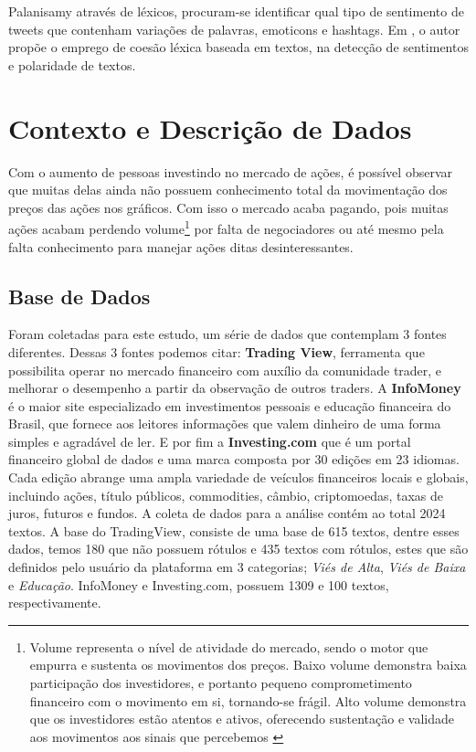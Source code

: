 \documentclass[conference]{IEEEtran}
\begin{document}
Palanisamy \cite{palanisamy:2013} através de léxicos, procuram-se identificar qual tipo de sentimento de tweets que contenham variações de palavras, emoticons e hashtags. Em \cite{Devitt:2007}, o autor propõe o emprego de coesão léxica baseada em textos, na detecção de sentimentos e polaridade de textos.


\section{Contexto e Descrição de Dados}

Com o aumento de pessoas investindo no mercado de ações, é possível observar que muitas delas ainda não possuem conhecimento total da movimentação dos preços das ações nos gráficos. Com isso o mercado acaba pagando, pois muitas ações acabam perdendo volume\footnote{Volume representa o nível de atividade do mercado, sendo o motor que empurra e sustenta os movimentos dos preços. Baixo volume demonstra baixa participação dos investidores, e portanto pequeno comprometimento financeiro com o movimento em si, tornando-se frágil. Alto volume demonstra que os investidores estão atentos e ativos, oferecendo sustentação e validade aos movimentos aos sinais que percebemos \cite{ANALISETECNICA}} por falta de negociadores ou até mesmo pela falta conhecimento para manejar ações ditas desinteressantes.

\subsection{Base de Dados}

Foram coletadas para este estudo, um série de dados que contemplam 3 fontes diferentes. Dessas 3 fontes podemos citar: \textbf{Trading View}, ferramenta que possibilita operar no mercado financeiro com auxílio da comunidade trader, e melhorar o desempenho a partir da observação de outros traders. A \textbf{InfoMoney} é o maior site especializado em investimentos pessoais e educação financeira do Brasil, que fornece aos leitores informações que valem dinheiro de uma forma simples e agradável de ler. E por fim a \textbf{Investing.com} que é um portal financeiro global de dados e uma marca composta por 30 edições em 23 idiomas. Cada edição abrange uma ampla variedade de veículos financeiros locais e globais, incluindo ações, título públicos, commodities, câmbio, criptomoedas, taxas de juros, futuros e fundos. A coleta de dados para a análise contém ao total 2024 textos. A base do TradingView, consiste de uma base de 615 textos, dentre esses dados, temos 180 que não possuem rótulos e 435 textos com rótulos, estes que são definidos pelo usuário da plataforma em 3 categorias; \textit{Viés de Alta}, \textit{Viés de Baixa} e \textit{Educação}. InfoMoney e Investing.com, possuem 1309 e 100 textos, respectivamente.
\end{document}
